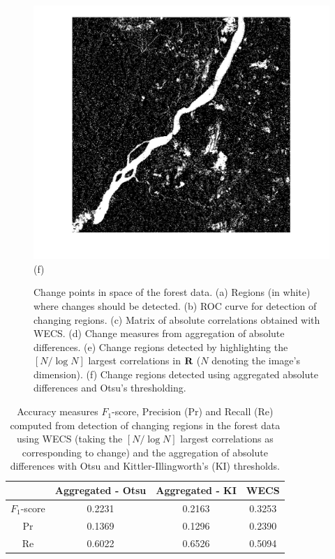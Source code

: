 \documentclass[journal]{IEEEtran}
\newcommand{\vR}{{\textbf R}}
\begin{document}
\begin{figure}[htp!]
\includegraphics[scale=.10]{../../figs/forest_aggreg_change_space}\hspace{-.5cm}(f)\\ 
\caption{Change points in space of the forest data. (a) Regions (in white) where changes should be detected. (b) ROC curve for detection of changing regions. (c) Matrix of absolute correlations obtained with WECS. (d) Change measures from aggregation of absolute differences. (e) Change regions detected by highlighting the $[N/\log N]$ largest correlations in $\vR$ ($N$ denoting the image's dimension). (f) Change regions detected using aggregated absolute differences and Otsu's thresholding.}
\label{F:forest_roc_wecs_agg}
\end{figure}


\begin{table}
\caption{Accuracy measures $F_1$-score, Precision ($\mathrm{Pr}$) and Recall ($\mathrm{Re}$) computed from detection of changing regions in the forest data using WECS (taking the $[N/\log N]$ largest correlations as corresponding to change) and the aggregation of absolute differences with Otsu and Kittler-Illingworth's (KI) thresholds.}
\centering
\begin{tabular}{c|ccc}
\hline
  & Aggregated - Otsu & Aggregated - KI & WECS \\
\hline
$F_1$-score & 0.2231 & 0.2163 & 0.3253 \\
$\mathrm{Pr}$ & 0.1369 & 0.1296 & 0.2390 \\
$\mathrm{Re}$ & 0.6022 & 0.6526 & 0.5094 \\
\hline
\end{tabular}
\label{T:forest_accuracy}
\end{table}
\end{document}
